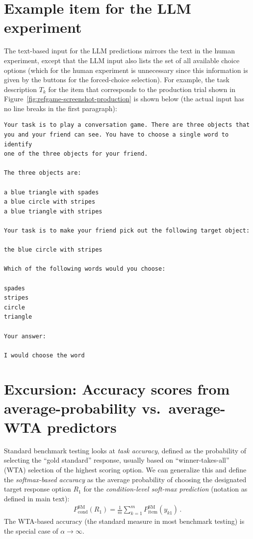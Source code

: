 \documentclass[fleqn]{article}
\begin{document}
\section{Example item for the LLM experiment}
\label{sec:examples-items-llm}

The text-based input for the LLM predictions mirrors the text in the human experiment, except that the LLM input also lists the set of all available choice options (which for the human experiment is unnecessary since this information is given by the buttons for the forced-choice selection).
For example, the task description $T_{k}$ for the item that corresponds to the production trial shown in Figure~\ref{fig:refgame-screenshot-production} is shown below (the actual input has no line breaks in the first paragraph):

\begin{verbatim}
Your task is to play a conversation game. There are three objects that
you and your friend can see. You have to choose a single word to identify
one of the three objects for your friend.

The three objects are:

a blue triangle with spades
a blue circle with stripes
a blue triangle with stripes

Your task is to make your friend pick out the following target object:

the blue circle with stripes

Which of the following words would you choose:

spades
stripes
circle
triangle

Your answer:

I would choose the word
\end{verbatim}

\section{Excursion: Accuracy scores from average-probability vs.~average-WTA predictors}
\label{sec:aver-prob-vs}

Standard benchmark testing looks at \emph{task accuracy}, defined as the probability of selecting the ``gold standard'' response, usually based on ``winner-takes-all'' (WTA) selection of the highest scoring option.
We can generalize this and define the \emph{softmax-based accuracy} as the average probability of choosing the designated target response option $R_{1}$ for the \emph{condition-level soft-max prediction} (notation as defined in main text):
\begin{align*}
  P_{\text{cond}}^{\text{SM}}\left(R_{1} \right) = \frac{1}{m} \sum_{k = 1}^{m} P_{\text{item}}^{\text{SM}} \left(y_{k1} \right)\,.
\end{align*}
The WTA-based accuracy (the standard measure in most benchmark testing) is the special case of $\alpha \rightarrow\infty$.
\end{document}

